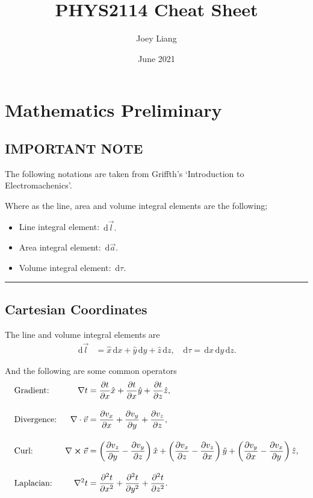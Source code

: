 \documentclass[a4paper]{article}
\title{PHYS2114 Cheat Sheet}
\date{June 2021}
\author{Joey Liang}
\newcommand{\dmr}[1]{\, \mathrm{d}#1} %
\numberwithin{equation}{subsection}
\begin{document}
\maketitle
\newpage
\tableofcontents
\newpage
\section{Mathematics Preliminary}
\subsection{IMPORTANT NOTE}
The following notations are taken from Griffth's `Introduction to Electromachenics'.\cite{Griffiths:611579}

Where as the line, area and volume integral elements are the following;
\begin{itemize}
    \item Line integral element: $\dmr{\vec{l}}.$
    \item Area integral element: $\dmr{\vec{a}}.$ 
    \item Volume integral element: $\dmr{\tau}.$
\end{itemize}

\par\noindent\rule{\textwidth}{0.4pt}

\subsection{Cartesian Coordinates}
The line and volume integral elements are
\begin{align*}
    \dmr{\vec{l}} &= \hat{x}\dmr{x} + \hat{y}\dmr{y} + \hat{z}\dmr{z}, & \dmr{\tau} = \dmr{x}\dmr{y}\dmr{z}.
\end{align*}

And the following are some common operators
\begin{align*}
    &\text{Gradient:} &\nabla t  &= \pdv{t}{x}\hat{x} + \pdv{t}{x}\hat{y} + \pdv{t}{z}\hat{z},\\[1em]
    &\text{Divergence:} &\nabla\cdot\vec{v} &= \pdv{v_x}{x} + \pdv{v_y}{y} + \pdv{v_z}{z},\\[1em]
    &\text{Curl:} &\nabla \cross \vec{v} &= \left(\pdv{v_z}{y}-\pdv{v_y}{z}\right)\hat{x} + \left(\pdv{v_x}{z}-\pdv{v_z}{x}\right)\hat{y} + \left(\pdv{v_y}{x}-\pdv{v_x}{y}\right)\hat{z},\\[1em]
    &\text{Laplacian:} &\laplacian t &= \pdv[2]{t}{x} + \pdv[2]{t}{y} +\pdv[2]{t}{z}. 
\end{align*}
\end{document}
